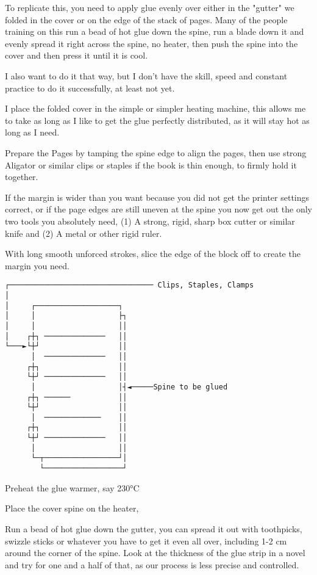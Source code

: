 \documentclass[
]{article}
\begin{document}
To replicate this, you need to apply glue evenly over either in the
"gutter" we folded in the cover or on the edge of the stack of pages.
Many of the people training on this run a bead of hot glue down the
spine, run a blade down it and evenly spread it right across the spine,
no heater, then push the spine into the cover and then press it until it
is cool.

I also want to do it that way, but I don't have the skill, speed and
constant practice to do it successfully, at least not yet.

I place the folded cover in the simple or simpler heating machine, this
allows me to take as long as I like to get the glue perfectly
distributed, as it will stay hot as long as I need.

Prepare the Pages by tamping the spine edge to align the pages, then use
strong Aligator or similar clips or staples if the book is thin enough,
to firmly hold it together.

If the margin is wider than you want because you did not get the printer
settings correct, or if the page edges are still uneven at the spine you
now get out the only two tools you absolutely need, (1) A strong, rigid,
sharp box cutter or similar knife and (2) A metal or other rigid ruler.

With long smooth unforced strokes, slice the edge of the block off to
create the margin you need.

\begin{verbatim}
┌───────────────────────────────── Clips, Staples, Clamps
│
│     ┌───────────────────┐
│     │                   ├┐
│     │                   ││
│    ┌┼┐ ──────────────   ││
└───►└┼┘                  ││
      │  ──────────────   ││
     ┌┼┐                  ││
     └┼┘ ──────────────   ││
      │                   │┤◄─────Spine to be glued
     ┌┼┐ ──────           ││
     └┼┘                  ││
      │  ─────────────    ││
     ┌┼┐                  ││
     └┼┘ ──────────────   ││
      │                   ││
      └─┬─────────────────┘│
        └──────────────────┘
\end{verbatim}

Preheat the glue warmer, say 230°C

Place the cover spine on the heater,

Run a bead of hot glue down the gutter, you can spread it out with
toothpicks, swizzle sticks or whatever you have to get it even all over,
including 1-2 cm around the corner of the spine. Look at the thickness
of the glue strip in a novel and try for one and a half of that, as our
process is less precise and controlled.
\end{document}
